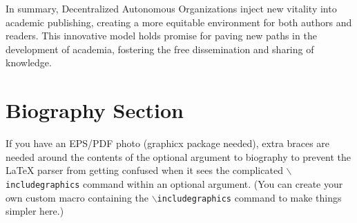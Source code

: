 \documentclass[lettersize,journal]{IEEEtran}
\begin{document}
In summary, Decentralized Autonomous Organizations inject new vitality into academic publishing, creating a more equitable environment for both authors and readers. This innovative model holds promise for paving new paths in the development of academia, fostering the free dissemination and sharing of knowledge.















\newpage

\section{Biography Section}
If you have an EPS/PDF photo (graphicx package needed), extra braces are
 needed around the contents of the optional argument to biography to prevent
 the LaTeX parser from getting confused when it sees the complicated
 $\backslash${\tt{includegraphics}} command within an optional argument. (You can create
 your own custom macro containing the $\backslash${\tt{includegraphics}} command to make things
 simpler here.)
 
\end{document}
